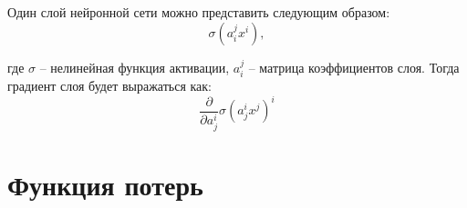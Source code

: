 \documentclass[12pt, oneside, a4paper, openany]{scrarticle}
\begin{document}
Один слой нейронной сети можно представить следующим образом:
\begin{equation}
	\sigma(a_i^jx^i),
\end{equation}

где $\sigma$ -- нелинейная функция активации, $a_i^j$ -- матрица коэффициентов слоя. Тогда градиент слоя будет выражаться как:
\begin{equation}
	\frac{\partial }{\partial a^i_j} \sigma(a^i_j x^j)^i
\end{equation}

\section{Функция потерь}



\newpage


\end{document}
